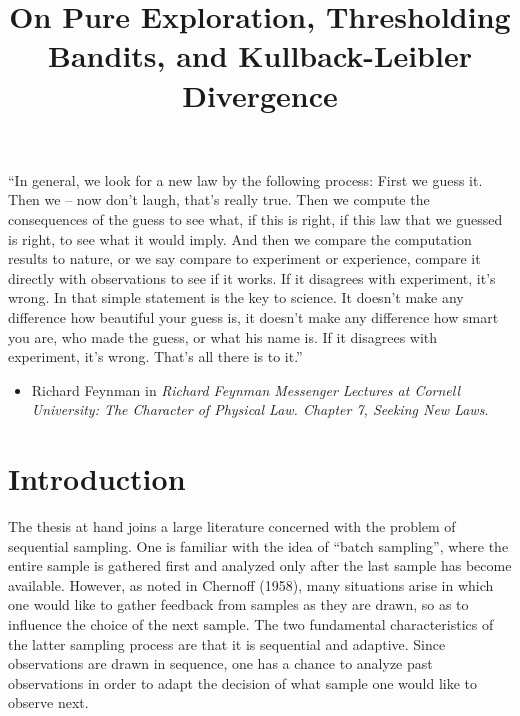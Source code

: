 \documentclass[11pt,]{article}
\title{On Pure Exploration, Thresholding Bandits, and Kullback-Leibler
Divergence}
\author{}
\date{}
\providecommand{\tightlist}{%
  \setlength{\itemsep}{0pt}\setlength{\parskip}{0pt}}
\begin{document}
\maketitle

{
\hypersetup{linkcolor=black}
\setcounter{tocdepth}{2}
\tableofcontents
}
\newpage

\vspace*{10\baselineskip}

``In general, we look for a new law by the following process: First we
guess it. Then we -- now don't laugh, that's really true. Then we
compute the consequences of the guess to see what, if this is right, if
this law that we guessed is right, to see what it would imply. And then
we compare the computation results to nature, or we say compare to
experiment or experience, compare it directly with observations to see
if it works. If it disagrees with experiment, it's wrong. In that simple
statement is the key to science. It doesn't make any difference how
beautiful your guess is, it doesn't make any difference how smart you
are, who made the guess, or what his name is. If it disagrees with
experiment, it's wrong. That's all there is to it.''

\begin{itemize}
\tightlist
\item
  Richard Feynman in \emph{Richard Feynman Messenger Lectures at Cornell
  University: The Character of Physical Law. Chapter 7, Seeking New
  Laws}.
\end{itemize}

\newpage

\section{\texorpdfstring{Introduction
\label{chap:Introduction}}{Introduction }}\label{introduction}

The thesis at hand joins a large literature concerned with the problem
of sequential sampling. One is familiar with the idea of ``batch
sampling'', where the entire sample is gathered first and analyzed only
after the last sample has become available. However, as noted in
Chernoff (1958), many situations arise in which one would like to gather
feedback from samples as they are drawn, so as to influence the choice
of the next sample. The two fundamental characteristics of the latter
sampling process are that it is sequential and adaptive. Since
observations are drawn in sequence, one has a chance to analyze past
observations in order to adapt the decision of what sample one would
like to observe next.
\end{document}
